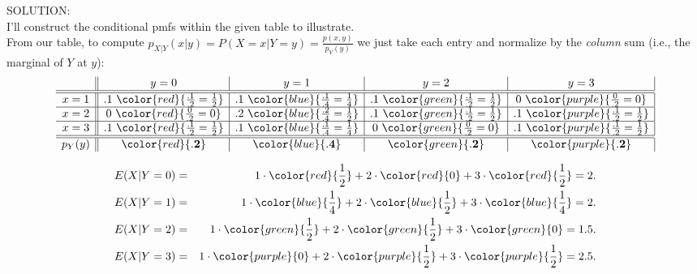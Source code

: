 \documentclass[12pt]{article}
\begin{document}
\noindent SOLUTION:\\
I'll construct the conditional pmfs within the given table to illustrate.\\
From our table, to compute $p_{X|Y}(x|y)=P(X=x|Y=y)=\frac {p(x,y)}{p_Y(y)}$ we just take each entry and normalize by the {\em column} sum (i.e., the marginal of $Y$ at $y$):
$$\begin{array}{c||c|c|c|c|} & y=0 & y=1 & y=2 & y=3 \\ \hline\hline
x=1 & .1 \ \color{red}{\frac {.1}{.2}=\frac 12} & .1 \ \color{blue}{\frac {.1}{.4}=\frac 14} & .1 \ \color{green}{\frac {.1}{.2}=\frac 12} &  0 \ \color{purple}{\frac 0{.2}=0}        \\ \hline
x=2 &  0 \ \color{red}{\frac 0{.2}=0}& .2 \ \color{blue}{\frac {.2}{.4}=\frac 12} & .1 \ \color{green}{\frac {.1}{.2}=\frac 12} & .1 \ \color{purple}{\frac {.1}{.2}=\frac 12} \\ \hline
x=3 & .1 \ \color{red}{\frac {.1}{.2}=\frac 12} & .1 \ \color{blue}{\frac {.1}{.4}=\frac 14} &  0 \ \color{green}{\frac 0{.2}=0}& .1 \ \color{purple}{\frac {.1}{.2}=\frac 12} \\ \hline\hline
p_Y(y) & \color{red}{\bf .2}     & \color{blue}{\bf .4}        & \color{green}{\bf .2}        & \color{purple}{\bf .2}        \end{array}$$

\begin{eqnarray*}
    E(X | Y = 0) &=& 1 \cdot {\color{red}{\frac 12}} + 2 \cdot {\color{red}{0}}  + 3 \cdot {\color{red}{\frac 12}} = 2. \\
    E(X | Y = 1) &=& 1 \cdot {\color{blue}{\frac 14}} + 2 \cdot {\color{blue}{\frac 12}} + 3 \cdot {\color{blue}{\frac 14}} = 2. \\
    E(X | Y = 2) &=& 1 \cdot {\color{green}{\frac 12}} + 2 \cdot {\color{green}{\frac 12}} + 3 \cdot {\color{green}{0}} = 1.5. \\
    E(X | Y = 3) &=& 1 \cdot {\color{purple}{0}}  + 2 \cdot {\color{purple}{\frac 12}} + 3 \cdot {\color{purple}{\frac 12}} = 2.5.
\end{eqnarray*}

\newpage
\end{document}
